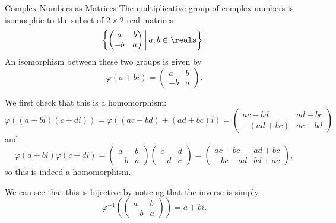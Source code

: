 \begin{exm}{Complex Numbers as Matrices}{}
    The multiplicative group of complex numbers is isomorphic to the subset of \(2\times 2\) real matrices
    \begin{equation}
        \left\{ 
        \begin{pmatrix}
            a & b\\
            -b & a
        \end{pmatrix}
        \,\middle\vert \, a, b \in \reals \right\}.
    \end{equation}
    An isomorphism between these two groups is given by
    \begin{equation}
        \varphi(a + bi) = 
        \begin{pmatrix}
            a & b\\
            -b & a
        \end{pmatrix}
        .
    \end{equation}
    
    We first check that this is a homomorphism:
    \begin{equation}
        \varphi((a + bi)(c + di)) = 
        \varphi((ac - bd) + (ad + bc)i) = 
        \begin{pmatrix}
            ac - bd & ad + bc\\
            -(ad + bc) & ac - bd
        \end{pmatrix}
    \end{equation}
    and
    \begin{equation}
        \varphi(a + bi)\varphi(c + di) = 
        \begin{pmatrix}
            a & b\\
            -b & a
        \end{pmatrix}
        \begin{pmatrix}
            c & d\\
            -d & c
        \end{pmatrix}
        =
        \begin{pmatrix}
            ac - bc & ad + bc\\
            -bc - ad & bd + ac
        \end{pmatrix},
    \end{equation}
    so this is indeed a homomorphism.
    
    We can see that this is bijective by noticing that the inverse is simply
    \begin{equation}
        \varphi^{-1}\left( 
        \begin{pmatrix}
            a & b\\
            -b & a
        \end{pmatrix}
        \right) = a + bi.
    \end{equation}
    

\end{exm}
